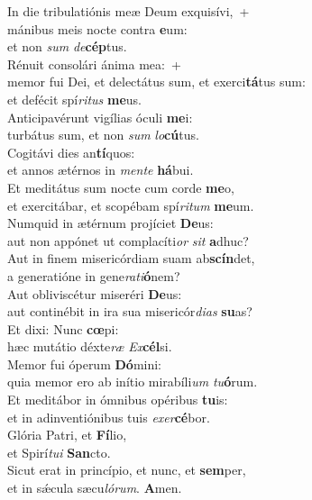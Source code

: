 \evenverse In die tribulatiónis meæ Deum exquisívi,~+\\\evenverse  mánibus meis nocte contra \textbf{e}um:~\*\\
\evenverse et non \textit{sum} \textit{de}\textbf{cép}tus.\\
\oddverse Rénuit consolári ánima mea:~+\\
\oddverse  memor fui Dei, et delectátus sum, et exerci\textbf{tá}tus sum:~\*\\
\oddverse et defécit spí\textit{ri}\textit{tus} \textbf{me}us.\\
\evenverse Anticipavérunt vigílias óculi \textbf{me}i:~\*\\
\evenverse turbátus sum, et non \textit{sum} \textit{lo}\textbf{cú}tus.\\
\oddverse Cogitávi dies an\textbf{tí}quos:~\*\\
\oddverse et annos ætérnos in \textit{men}\textit{te} \textbf{há}bui.\\
\evenverse Et meditátus sum nocte cum corde \textbf{me}o,~\*\\
\evenverse et exercitábar, et scopébam spí\textit{ri}\textit{tum} \textbf{me}um.\\
\oddverse Numquid in ætérnum projíciet \textbf{De}us:~\*\\
\oddverse aut non appónet ut complacíti\textit{or} \textit{sit} \textbf{a}dhuc?\\
\evenverse Aut in finem misericórdiam suam ab\textbf{scín}det,~\*\\
\evenverse a generatióne in gene\textit{ra}\textit{ti}\textbf{ó}nem?\\
\oddverse Aut obliviscétur miseréri \textbf{De}us:~\*\\
\oddverse aut continébit in ira sua misericór\textit{di}\textit{as} \textbf{su}as?\\
\evenverse Et dixi: Nunc \textbf{cœ}pi:~\*\\
\evenverse hæc mutátio déxte\textit{ræ} \textit{Ex}\textbf{cél}si.\\
\oddverse Memor fui óperum \textbf{Dó}mini:~\*\\
\oddverse quia memor ero ab inítio mirabíli\textit{um} \textit{tu}\textbf{ó}rum.\\
\evenverse Et meditábor in ómnibus opéribus \textbf{tu}is:~\*\\
\evenverse et in adinventiónibus tuis \textit{e}\textit{xer}\textbf{cé}bor.\\
\oddverse Glória Patri, et \textbf{Fí}lio,~\*\\
\oddverse et Spirí\textit{tu}\textit{i} \textbf{San}cto.\\
\evenverse Sicut erat in princípio, et nunc, et \textbf{sem}per,~\*\\
\evenverse et in sǽcula sæcu\textit{ló}\textit{rum}. \textbf{A}men.\\
